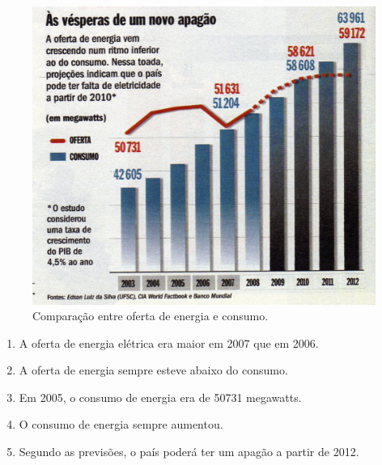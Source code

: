 \documentclass[10pt,a4paper]{article}
\begin{document}
\begin{multicols}{2}
\begin{enumerate}
\begin{figure}
     \includegraphics{apagao.jpg}
     \caption{Comparação entre oferta de energia e consumo.}
     \label{energia}
\end{figure}


		\begin{enumerate}
		\item A oferta de energia elétrica era maior em 2007 que em 2006.
		\item A oferta de energia sempre esteve abaixo do consumo.
		\item Em 2005, o consumo de energia era de 50731 megawatts.
		\item O consumo de energia sempre aumentou.
		\item Segundo as previsões, o país poderá ter um apagão a partir de 2012.
		\end{enumerate}



\end{enumerate}
\end{multicols}
\end{document}
